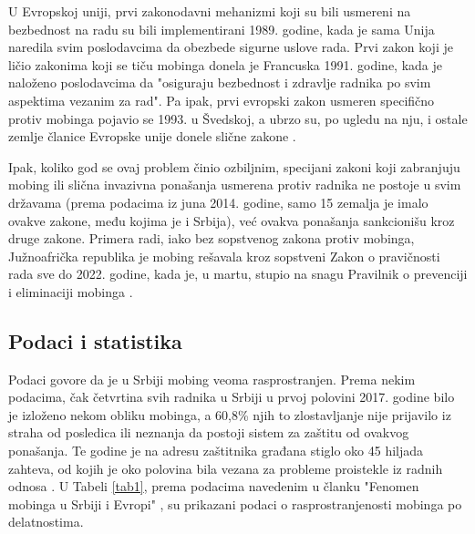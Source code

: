 \documentclass[a4paper]{article}
\newcommand{\quotes}[1]{"#1"}
\begin{document}
    U Evropskoj uniji, prvi zakonodavni mehanizmi koji su bili usmereni na bezbednost na radu su bili implementirani 1989. godine, kada je sama Unija naredila svim poslodavcima da obezbede sigurne uslove rada. Prvi zakon koji je ličio zakonima koji se tiču mobinga donela je Francuska 1991. godine, kada je naloženo poslodavcima da \quotes{osiguraju bezbednost i zdravlje radnika po svim aspektima vezanim za rad}. Pa ipak, prvi evropski zakon usmeren specifično protiv mobinga pojavio se 1993. u Švedskoj, a ubrzo su, po ugledu na nju, i ostale zemlje članice Evropske unije donele slične zakone \cite{francemobbing}.
    
    Ipak, koliko god se ovaj problem činio ozbiljnim, specijani zakoni koji zabranjuju mobing ili slična invazivna ponašanja usmerena protiv radnika ne postoje u svim državama (prema podacima iz juna 2014. godine, samo 15 zemalja je imalo ovakve zakone, među kojima je i Srbija\cite{samo15}), već ovakva ponašanja sankcionišu kroz druge zakone. Primera radi, iako bez sopstvenog zakona protiv mobinga, Južnoafrička republika je mobing rešavala kroz sopstveni Zakon o pravičnosti rada sve do 2022. godine, kada je, u martu, stupio na snagu Pravilnik o prevenciji i eliminaciji mobinga \cite{jar1, jar2}.
    
    \subsection{Podaci i statistika}
    
    Podaci govore da je u Srbiji mobing veoma rasprostranjen. Prema nekim podacima, čak četvrtina svih radnika u Srbiji u prvoj polovini 2017. godine bilo je izloženo nekom obliku mobinga, a 60,8\% njih to zlostavljanje nije prijavilo iz straha od posledica ili neznanja da postoji sistem za zaštitu od ovakvog ponašanja. Te godine je na adresu zaštitnika građana stiglo oko 45 hiljada zahteva, od kojih je oko polovina bila vezana za probleme proistekle iz radnih odnosa \cite{kamaticacetvrtina, fenomensrbijaevropa}. U Tabeli \ref{tab1}, prema podacima navedenim u članku \quotes{Fenomen mobinga u Srbiji i Evropi} \cite{fenomensrbijaevropa}, su prikazani podaci o rasprostranjenosti mobinga po delatnostima.
    
\end{document}
